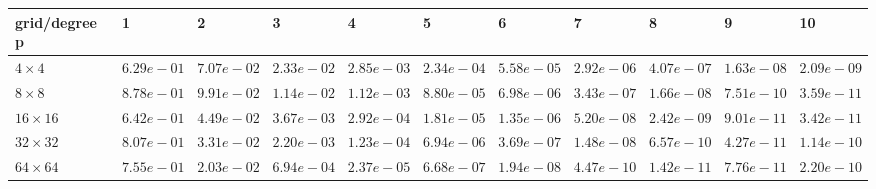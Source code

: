 \begin{tabular}{lllllllllll}
\hline
 grid/degree p   & 1          & 2          & 3          & 4          & 5          & 6          & 7          & 8          & 9          & 10         \\
\hline
 $4 \times 4$    & $6.29e-01$ & $7.07e-02$ & $2.33e-02$ & $2.85e-03$ & $2.34e-04$ & $5.58e-05$ & $2.92e-06$ & $4.07e-07$ & $1.63e-08$ & $2.09e-09$ \\
 $8 \times 8$    & $8.78e-01$ & $9.91e-02$ & $1.14e-02$ & $1.12e-03$ & $8.80e-05$ & $6.98e-06$ & $3.43e-07$ & $1.66e-08$ & $7.51e-10$ & $3.59e-11$ \\
 $16 \times 16$  & $6.42e-01$ & $4.49e-02$ & $3.67e-03$ & $2.92e-04$ & $1.81e-05$ & $1.35e-06$ & $5.20e-08$ & $2.42e-09$ & $9.01e-11$ & $3.42e-11$ \\
 $32 \times 32$  & $8.07e-01$ & $3.31e-02$ & $2.20e-03$ & $1.23e-04$ & $6.94e-06$ & $3.69e-07$ & $1.48e-08$ & $6.57e-10$ & $4.27e-11$ & $1.14e-10$ \\
 $64 \times 64$  & $7.55e-01$ & $2.03e-02$ & $6.94e-04$ & $2.37e-05$ & $6.68e-07$ & $1.94e-08$ & $4.47e-10$ & $1.42e-11$ & $7.76e-11$ & $2.20e-10$ \\
\hline
\end{tabular}